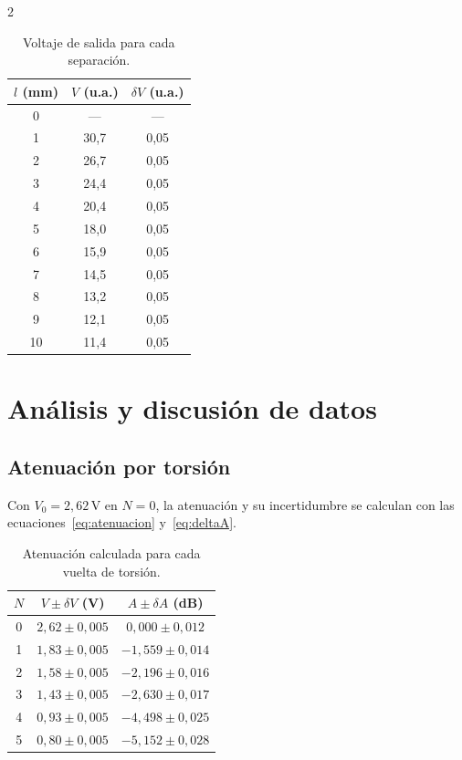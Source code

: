 \documentclass[12pt,a4paper]{article}
\begin{document}
\begin{multicols}{2}
\begin{table}[H]
\centering
\caption{Voltaje de salida para cada separación.}
\label{tab:raw_sep}
\small
\begin{tabular}{ccc}
\toprule
$l$ (mm) & $V$ (u.a.) & $\delta V$ (u.a.) \\
\midrule
0  & ---    & --- \\
1  & 30{,}7 & 0{,}05 \\
2  & 26{,}7 & 0{,}05 \\
3  & 24{,}4 & 0{,}05 \\
4  & 20{,}4 & 0{,}05 \\
5  & 18{,}0 & 0{,}05 \\
6  & 15{,}9 & 0{,}05 \\
7  & 14{,}5 & 0{,}05 \\
8  & 13{,}2 & 0{,}05 \\
9  & 12{,}1 & 0{,}05 \\
10 & 11{,}4 & 0{,}05 \\
\bottomrule
\end{tabular}
\end{table}

\section{Análisis y discusión de datos}

\subsection{Atenuación por torsión}

Con $V_0=2{,}62$\,V en $N=0$, la atenuación y su incertidumbre se calculan con las ecuaciones~\eqref{eq:atenuacion} y~\eqref{eq:deltaA}.

\begin{table}[H]
\centering
\caption{Atenuación calculada para cada vuelta de torsión.}
\label{tab:att_torsion}
\small
\begin{tabular}{ccc}
\toprule
$N$ & $V \pm \delta V$ (V) & $A \pm \delta A$ (dB) \\
\midrule
0 & $2{,}62 \pm 0{,}005$ & $0{,}000 \pm 0{,}012$ \\
1 & $1{,}83 \pm 0{,}005$ & $-1{,}559 \pm 0{,}014$ \\
2 & $1{,}58 \pm 0{,}005$ & $-2{,}196 \pm 0{,}016$ \\
3 & $1{,}43 \pm 0{,}005$ & $-2{,}630 \pm 0{,}017$ \\
4 & $0{,}93 \pm 0{,}005$ & $-4{,}498 \pm 0{,}025$ \\
5 & $0{,}80 \pm 0{,}005$ & $-5{,}152 \pm 0{,}028$ \\
\bottomrule
\end{tabular}
\end{table}


\end{multicols}
\end{document}
